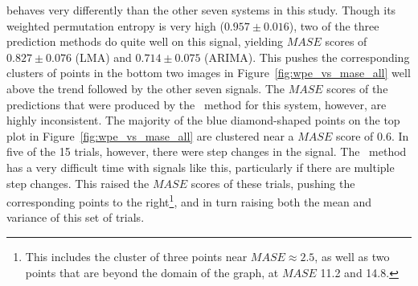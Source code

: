 \svdone behaves very differently than the other seven systems in this
study.  Though its weighted permutation entropy is very high ($0.957
\pm 0.016$), two of the three prediction methods do quite well on this
signal, yielding $MASE$ scores of $0.827 \pm 0.076$ (LMA) and $0.714
\pm 0.075$ (ARIMA).  This pushes the corresponding clusters of points
in the bottom two images in Figure~\ref{fig:wpe_vs_mase_all} well
above the trend followed by the other seven signals.  The $MASE$
scores of the predictions that were produced by the \naive ~method for
this system, however, are highly inconsistent.  The majority of the
blue diamond-shaped points on the top plot in
Figure~\ref{fig:wpe_vs_mase_all} are clustered near a $MASE$ score of
0.6.  In five of the 15 \svdone trials, however, there were step
changes in the signal.  The \naive ~method has a very difficult time
with signals like this, particularly if there are multiple step
changes.  This raised the $MASE$ scores of these trials, pushing the
corresponding points to the right\footnote{This includes the cluster
  of three points near $MASE \approx 2.5$, as well as two points that
  are beyond the domain of the graph, at $MASE$ 11.2 and 14.8.}, and
in turn raising both the mean and variance of this set of trials.

